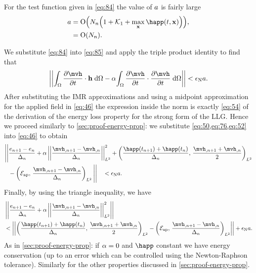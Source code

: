For the test function given in \cref{eq:84} the value of $a$ is fairly large
\begin{equation}
  \begin{aligned}
    a &= \order{N_n \bigb{1 + \kone + \max_{\xv} \happ(t, \xv)} }, \\
    &= \order{N_n}.
  \end{aligned}
\end{equation}


We substitute \cref{eq:84} into \cref{eq:85} and apply the triple product identity to find that
\begin{equation}
  \norm{\intd{\dmdth \cdot \hv} - \dampc \intd{\dmdth \cdot \dmdth}} < \ntol \sumbasiscoeff.
  \label{eq:46}
\end{equation}
After substituting the IMR approximations and using a midpoint approximation for the applied field in \cref{eq:46} the expression inside the norm is exactly \cref{eq:54} of the derivation of the energy loss property for the strong form of the LLG.
Hence we proceed similarly to \cref{sec:proof-energy-prop}: we substitute  \cref{eq:50,eq:76,eq:52} into \cref{eq:46} to obtain
\begin{equation}
  \begin{aligned}
    \Bigg|\Bigg| &\frac{\e_{n+1} - \e_n}{\dtn} + \dampc \ltnorm{\frac{\mvh_{,n+1} - \mvh_{,n}}{\dtn}}^2 +
      \ltip{\frac{\happ(t_{n+1}) +\happ(t_n)}{\dtn}}{\frac{\mvh_{,n+1} +
          \mvh_{,n}}{2}} \\
      &- \ltip{\happerror}{\frac{\mvh_{,n+1} - \mvh_{,n}}{\dtn}} \Bigg|\Bigg| \quad < \ntol \sumbasiscoeff.
  \end{aligned}
\end{equation}
Finally, by using the triangle inequality, we have
\begin{equation}
  \begin{aligned}
    &\norm{ \frac{\e_{n+1} - \e_n}{\dtn} + \dampc \ltnorm{\frac{\mvh_{,n+1} - \mvh_{,n}}{\dtn}}^2 } \\
    &< \norm{\ltip{\frac{\happ(t_{n+1}) + \happ(t_n)}{\dtn}}{\frac{\mvh_{,n+1} + \mvh_{,n}}{2}} - \ltip{\happerror}{\frac{\mvh_{,n+1} - \mvh_{,n}}{\dtn}} }
  + \ntol \sumbasiscoeff.
  \label{eq:86}
  \end{aligned}
\end{equation}
As in \cref{sec:proof-energy-prop}: if $\alpha = 0$ and $\happ$ constant we have energy conservation (up to an error which can be controlled using the Newton-Raphson tolerance). Similarly for the other properties discussed in \cref{sec:proof-energy-prop}.

